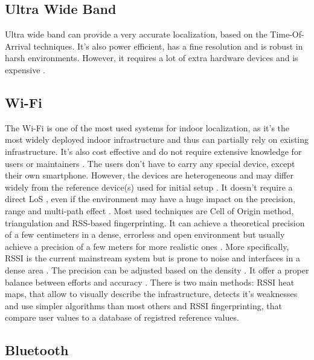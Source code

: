 \subsection{Ultra Wide Band}

Ultra wide band can provide a very accurate localization, based on the Time-Of-Arrival techniques. It's also power efficient, has a fine resolution and is robust in harsh environments. However, it requires a lot of extra hardware devices \cite{spachos_ble_2020} and is expensive \cite{shang_overview_2022}.

\subsection{Wi-Fi}

The Wi-Fi is one of the most used systems for indoor localization, as it's the most widely deployed indoor infrastructure and thus can partially rely on existing infrastructure. It's also cost effective \cite{mainetti_survey_2014} and do not require extensive knowledge for users or maintainers \cite{shang_overview_2022}. The users don't have to carry any special device, except their own smartphone. However, the devices are heterogeneous and may differ widely from the reference device(s) used for initial setup \cite{liu_survey_2020}. It doesn't require a direct LoS \cite{mainetti_survey_2014}, even if the environment may have a huge impact on the precision, range and multi-path effect \cite{liu_survey_2020}. Most used techniques are Cell of Origin method, triangulation and RSS-based fingerprinting. It can achieve a theoretical precision of a few centimeters in a dense, errorless and open environment but usually achieve a precision of a few meters for more realistic ones \cite{liu_survey_2020}. More specifically, RSSI is the current mainstream system but is prone to noise and interfaces in a dense area \cite{spachos_ble_2020}. The precision can be adjusted based on the density \cite{shang_overview_2022}. It offer a proper balance between efforts and accuracy \cite{ali_locali_2017}. There is two main methods:
 RSSI heat maps, that allow to visually describe the infrastructure, detects it's weaknesses and use simpler algorithms than most others \cite{ali_locali_2017} and RSSI fingerprinting, that compare user values to a database of registred reference values. 

\subsection{Bluetooth}

